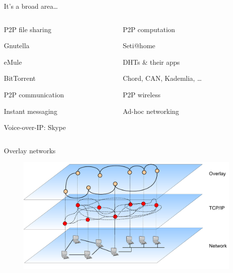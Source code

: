 \begin{frame}{It's a broad area\ldots}

\begin{columns}
\begin{column}{0.5\textwidth}
\BIL
\item P2P file sharing
	\BI
	\item Gnutella
	\item eMule
	\item BitTorrent
	\EI
\item P2P communication
	\BI
	\item Instant messaging
	\item Voice-over-IP: Skype
	\EI
\EIL
\end{column}
\begin{column}{0.5\textwidth}
\BIL
\item P2P computation
	\BI
	\item Seti@home
	\EI
\item DHTs \& their apps
	\BI
	\item Chord, CAN, Kademlia, \ldots
	\EI
\item P2P wireless
	\BI
	\item Ad-hoc networking
	\EI
\EIL
\end{column}
\end{columns}

\end{frame}



\begin{frame}{Overlay networks}
\begin{figure}
	\includegraphics[width=\textwidth]{figs/10/overlay}
\end{figure}
\end{frame}

